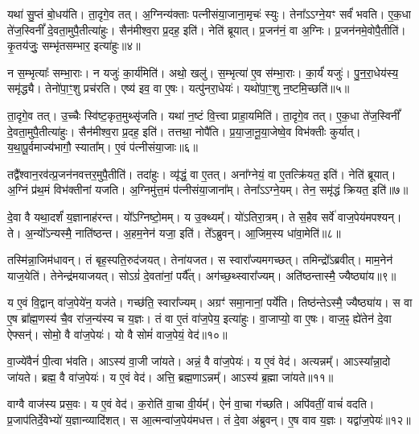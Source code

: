 यथा॑ सु॒प्तं बो॒धय॑ति।
ता॒दृगे॒व तत्।
अ॒ग्निन्य॑क्ताः पत्नीसंया॒जाना॒मृचः॑ स्युः।
तेना᳚ऽऽग्ने॒यꣳ सर्वं॑ भवति।
ए॒क॒धा ते॑ज॒स्विनीं᳚ दे॒वता॒मुपै॒तीत्या॑हुः।
सैन॑मीश्व॒रा प्र॒दह॒ इति॑।
नेति॑ ब्रूयात्।
प्र॒जन॑नं॒ वा अ॒ग्निः।
प्र॒जन॑नमे॒वोपै॒तीति॑।
कृ॒तय॑जुः॒ सम्भृ॑तसम्भार॒ इत्या॑हुः॥४॥

न स॒म्भृत्याः᳚ सम्भा॒राः।
न यजुः॑ का॒र्य॑मिति॑।
अथो॒ खलु॑।
स॒म्भृत्या॑ ए॒व स॑म्भा॒राः।
का॒र्यं॑ यजुः॑।
पु॒न॒रा॒धेय॑स्य॒ समृ॑द्ध्यै।
तेनो॑पा॒ꣳ॒शु प्रच॑रति।
एष्य॑ इव॒ वा ए॒षः।
यत्पु॑नरा॒धेयः॑।
यथो॑पा॒ꣳ॒शु न॒ष्टमि॒च्छति॑॥५॥

ता॒दृगे॒व तत्।
उ॒च्चैः स्वि॑ष्ट॒कृत॒मुथ्सृ॑जति।
यथा॑ न॒ष्टं वि॒त्त्वा प्राहा॒यमिति॑।
ता॒दृगे॒व तत्।
ए॒क॒धा ते॑ज॒स्विनीं᳚ दे॒वता॒मुपै॒तीत्या॑हुः।
सैन॑मीश्व॒रा प्र॒दह॒ इति॑।
तत्तथा॒ नोपै॑ति।
प्र॒या॒जा॒नू॒या॒जेष्वे॒व विभ॑क्तीः कुर्यात्।
य॒था॒पू॒र्वमाज्य॑भागौ॒ स्याता᳚म्।
ए॒वं प॑त्नीसंया॒जाः॥६॥

तद्वै᳚श्वान॒रव॑त्प्र॒जन॑नवत्तर॒मुपै॒तीति॑।
तदा॑हुः।
व्यृ॑द्धं॒ वा ए॒तत्।
अना᳚ग्नेयं॒ वा ए॒तत्क्रि॑यत॒ इति॑।
नेति॑ ब्रूयात्।
अ॒ग्निं प्र॑थ॒मं विभ॑क्तीनां यजति।
अ॒ग्निमु॑त्त॒मं प॑त्नीसंया॒जाना᳚म्।
तेना᳚ऽऽग्ने॒यम्।
तेन॒ समृ॑द्धं क्रियत॒ इति॑॥७॥\anuvakamend[अ॒रु॒न्ध॒तै॒व तद्भ॑वति॒ सम्भृ॑तसम्भार॒ इत्या॑हुरि॒च्छति॑ पत्नीसंया॒जा नव॑ च]

दे॒वा वै यथा॒दर्\mbox{}शं॑ य॒ज्ञानाह॑रन्त।
यो᳚ऽग्निष्टो॒मम्।
य उ॒क्थ्यम्᳚।
यो॑ऽतिरा॒त्रम्।
ते स॒हैव सर्वे॑ वाज॒पेय॑मपश्यन्।
ते।
अ॒न्यो᳚\-ऽन्यस्मै॒ नाति॑ष्ठन्त।
अ॒हम॒नेन॑ यजा॒ इति॑।
ते᳚ऽब्रुवन्।
आ॒जिम॒स्य धा॑वा॒मेति॑॥८॥

तस्मि॑न्ना॒जिम॑धावन्।
तं बृह॒स्पति॒रुद॑जयत्।
तेना॑यजत।
स स्वारा᳚ज्यमगच्छत्।
तमिन्द्रो᳚\-ऽब्रवीत्।
माम॒नेन॑ याज॒येति॑।
तेनेन्द्र॑मयाजयत्।
सोऽग्रं॑ दे॒वता॑नां॒ पर्यै᳚त्।
अग॑च्छ॒थ्स्वारा᳚ज्यम्।
अति॑ष्ठन्तास्मै॒ ज्यैष्ठ्या॑य॥९॥

य ए॒वं वि॒द्वान् वा॑ज॒पेये॑न॒ यज॑ते।
गच्छ॑ति॒ स्वारा᳚ज्यम्।
अग्रꣳ॑ समा॒नानां॒ पर्ये॑ति।
तिष्ठ॑न्ते\-ऽस्मै॒ ज्यैष्ठ्या॑य।
स वा ए॒ष ब्रा᳚ह्म॒णस्य॑ चै॒व रा॑ज॒न्य॑स्य च य॒ज्ञः।
तं वा ए॒तं वा॑ज॒पेय॒ इत्या॑हुः।
वा॒जाप्यो॒ वा ए॒षः।
वाज॒ꣴ॒ ह्ये॑तेन॑ दे॒वा ऐफ्सन्॑।
सोमो॒ वै वा॑ज॒पेयः॑।
यो वै सोमं॑ वाज॒पेयं॒ वेद॑॥१०॥

वा॒ज्ये॑वैनं॑ पी॒त्वा भ॑वति।
आऽस्य॑ वा॒जी जा॑यते।
अन्नं॒ वै वा॑ज॒पेयः॑।
य ए॒वं वेद॑।
अत्यन्नम्᳚।
आऽस्या᳚न्ना॒दो जा॑यते।
ब्रह्म॒ वै वा॑ज॒पेयः॑।
य ए॒वं वेद॑।
अत्ति॒ ब्रह्म॒णा\-ऽन्नम्᳚।
आऽस्य॑ ब्र॒ह्मा जा॑यते॥११॥

वाग्वै वाज॑स्य प्रस॒वः।
य ए॒वं वेद॑।
क॒रोति॑ वा॒चा वी॒र्यम्᳚।
ऐनं॑ वा॒चा ग॑च्छति।
अपि॑वतीं॒ वाचं॑ वदति।
प्र॒जा\-प॑तिर्दे॒वेभ्यो॑ य॒ज्ञान्व्यादि॑शत्।
स आ॒त्मन्वा॑ज॒पेय॑मधत्त।
तं दे॒वा अ॑ब्रुवन्।
ए॒ष वाव य॒ज्ञः।
यद्वा॑ज॒पेयः॑॥१२॥

